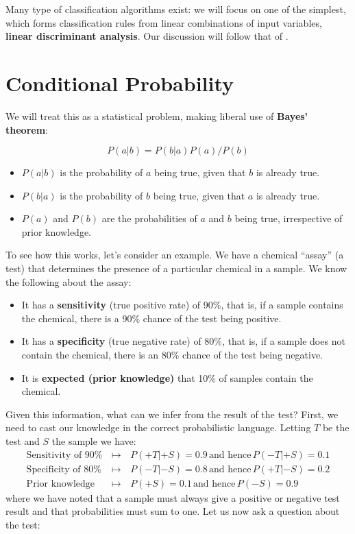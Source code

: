 \documentclass[12pt,a4paper]{tufte-handout}
\begin{document}
Many type of classification algorithms exist: we will focus on one of the simplest, which forms classification rules from linear combinations of input variables, \textbf{linear discriminant analysis}. Our discussion will follow that of \citet{izenman2008modern}.

\section{Conditional Probability}
We will treat this as a statistical problem, making liberal use of \textbf{Bayes' theorem}:

\begin{equation}
  P(a|b) = P(b|a)P(a)/P(b)
\end{equation}

\begin{itemize}
  \item $P(a|b)$ is the probability of $a$ being true, given that $b$ is already true.
  \item $P(b|a)$ is the probability of $b$ being true, given that $a$ is already true.
  \item $P(a)$ and $P(b)$ are the probabilities of $a$ and $b$ being true, irrespective of prior knowledge.
\end{itemize}

To see how this works, let's consider an example. We have a chemical ``assay'' (a test) that determines the presence of a particular chemical in a sample. We know the following about the assay:
\begin{itemize}
  \item It has a \textbf{sensitivity} (true positive rate) of 90\%, that is, if a sample contains the chemical, there is a 90\% chance of the test being positive.
  \item It has a \textbf{specificity} (true negative rate) of 80\%, that is, if a sample does not contain the chemical, there is an 80\% chance of the test being negative.
  \item It is \textbf{expected (prior knowledge)} that 10\% of samples contain the chemical.
\end{itemize}

Given this information, what can we infer from the result of the test? First, we need to cast our knowledge in the correct probabilistic language. Letting $T$ be the test and $S$ the sample we have:
\begin{eqnarray*}
  \mbox{Sensitivity of 90\%}\, &\mapsto&\, P(+T|+S) = 0.9\, \mbox{and hence}\, P(-T|+S)=0.1\\
  \mbox{Specificity of 80\%}\, &\mapsto&\, P(-T|-S) = 0.8\, \mbox{and hence}\, P(+T|-S)=0.2\\
  \mbox{Prior knowledge}\, &\mapsto&\, P(+S) = 0.1\, \mbox{and hence}\, P(-S)=0.9
\end{eqnarray*}
where we have noted that a sample must always give a positive or negative test result and that probabilities must sum to one. Let us now ask a question about the test:
\end{document}
